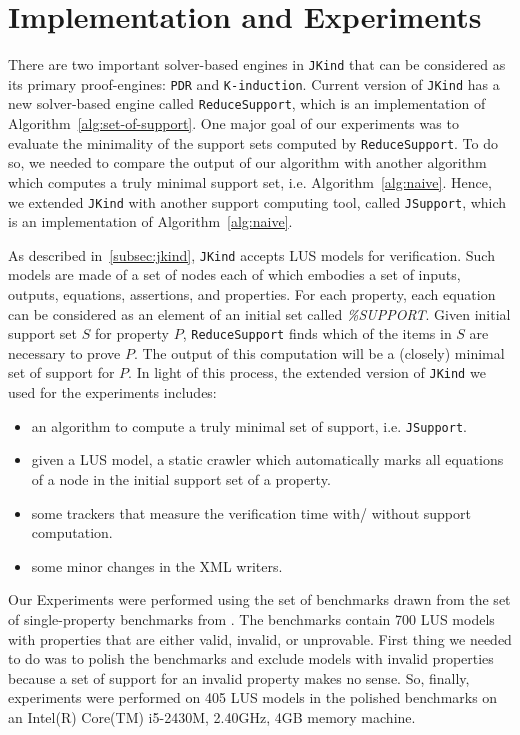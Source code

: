 \section{Implementation and Experiments}
\label{sec:exprm}
There are two important solver-based engines in \texttt{JKind} that can be considered as its primary proof-engines: \texttt{PDR} and \texttt{K-induction}. Current version of \texttt{JKind} has a new solver-based engine called \texttt{ReduceSupport}, 
which is an implementation of Algorithm~\ref{alg:set-of-support}. 
One major goal of our experiments was to evaluate the minimality of the support sets computed by \texttt{ReduceSupport}.
To do so, we needed to compare the output of our algorithm with another algorithm
which computes a truly minimal support set, i.e. Algorithm~\ref{alg:naive}. Hence, we extended \texttt{JKind}
with another support computing tool, called \texttt{JSupport}, which is an implementation of Algorithm~\ref{alg:naive}.

As described in~\ref{subsec:jkind}, \texttt{JKind} accepts LUS models for verification.
Such models are made of a set of nodes each of which embodies a set of inputs, outputs, equations, assertions, and properties. For each property, each equation can be considered as an element of an initial set called \textit{\%SUPPORT}. Given initial support set $S$ for property $P$, \texttt{ReduceSupport} finds which of the items in $S$ are necessary to prove $P$. The output of this computation will be a (closely) minimal set of support for $P$. In light of this process, the extended version of \texttt{JKind} we used for the experiments includes:

\begin{itemize}
    \item an algorithm to compute a truly minimal set of support, i.e. \texttt{JSupport}.
    \item given a LUS model, a static crawler which automatically marks all equations of a node in the initial support set of a property.
    \item some trackers that measure the verification time with/ without support computation.
    \item some minor changes in the XML writers.
\end{itemize}

Our Experiments were performed using the set of benchmarks drawn from the set of single-property benchmarks from \cite{benchmarks}. The benchmarks contain 700 LUS models with properties that are either valid, invalid, or unprovable. First thing we needed to do was to polish the benchmarks and exclude models with invalid properties because a set of support for an invalid property makes no sense. So, finally, experiments were performed on 405 LUS models in the polished benchmarks on an Intel(R) Core(TM) i5-2430M, 2.40GHz, 4GB memory machine.

